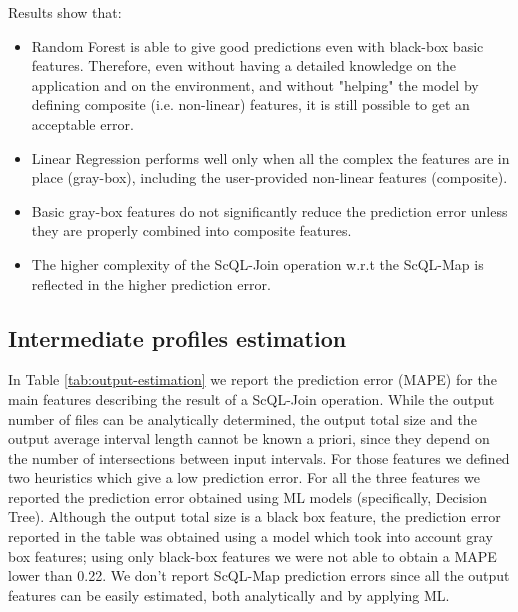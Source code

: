 \documentclass[a4paper, 10pt, conference]{ieeeconf}      %
\begin{document}
\noindent Results show that:
\begin{itemize}
    \item Random Forest is able to give good predictions even with black-box basic features. Therefore,  even without having a detailed knowledge on the application and on the environment, and without "helping" the model by defining composite (i.e. non-linear) features, it is still possible to get an acceptable error. 
    \item Linear Regression performs well only when all the complex the features are in place (gray-box), including the user-provided non-linear features (composite). 
    \item Basic gray-box features do not significantly reduce the prediction error unless they are properly combined into composite features. 
    \item The higher complexity of the ScQL-Join operation w.r.t the ScQL-Map is reflected in the higher prediction error.
    \color{blue}
    \color{black}
\end{itemize}


\subsection{Intermediate profiles estimation}
\label{subsec:results-profile}
In Table \ref{tab:output-estimation} we report the prediction error (MAPE) for the main features describing the result of a ScQL-Join operation.
While the output number of files can be analytically determined, the output total size and the output average interval length cannot be known a priori, since they depend on the number of intersections between input intervals. For those features we defined two heuristics which give a low prediction error. For all the three features we reported the prediction error obtained using ML models (specifically, Decision Tree). Although the output total size is a black box feature, the prediction error reported in the table was obtained using a model which took into account gray box features; using only black-box features we were not able to obtain a  MAPE lower than 0.22. We don't report ScQL-Map prediction errors since all the output features can be easily estimated, both analytically and by applying ML.
\end{document}
